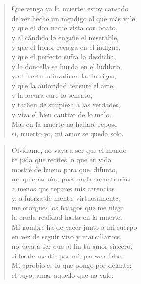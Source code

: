 \documentclass[12pt]{article}
\begin{document}
\clearpage
{}
\begin{verse}

Que venga ya la muerte: estoy cansado\\
de ver hecho un mendigo al que más vale,\\
y que el don nadie vista con boato,\\
y al cándido lo engañe el miserable,\\
y que el honor recaiga en el indigno,\\
y que el perfecto sufra la desdicha,\\
y la doncella se hunda en el ludibrio,\\
y al fuerte lo invaliden las intrigas,\\
y que la autoridad censure el arte,\\
y la locura cure lo sensato,\\
y tachen de simpleza a las verdades,\\
y viva el bien cautivo de lo malo.\\
Mas en la muerte no hallaré reposo\\
si, muerto yo, mi amor se queda solo.

\end{verse}

\clearpage
{}
\begin{verse}

Olvídame, no vaya a ser que el mundo\\
te pida que recites lo que en vida\\
mostré de bueno para que, difunto,\\
me quieras aún, pues nada encontrarías\\
a menos que repares mis carencias\\
y, a fuerza de mentir virtuosamente,\\
me otorgues los halagos que me niega\\
la cruda realidad hasta en la muerte.\\
Mi nombre ha de yacer junto a mi cuerpo\\
en vez de seguir vivo y mancillarnos,\\
no vaya a ser que al fin tu amor sincero,\\
si ha de mentir por mí, parezca falso.\\
Mi oprobio es lo que pongo por delante;\\
el tuyo, amar aquello que no vale.

\end{verse}
\end{document}
